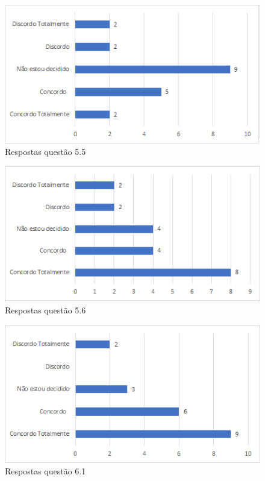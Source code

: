 \begin{figure}[!t]
\centering
\includegraphics[scale=0.7]{figuras das questoes/5.5.png}
\caption{Respostas questão 5.5}
\end{figure}
 
\begin{figure}[!t]
\centering
\includegraphics[scale=0.7]{figuras das questoes/5.6.png}
\caption{Respostas questão 5.6}
\end{figure}
   
\begin{figure}[!t]
\centering
\includegraphics[scale=0.7]{figuras das questoes/6.1.png}
\caption{Respostas questão 6.1}
\end{figure}

